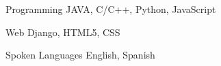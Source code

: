 \documentclass[12pt, a4paper]{awesome-cv}
\begin{document}
\begin{cventries}

\end{cventries}


\begin{cvskills}
  \cvskill
    {Programming} 
    {JAVA, C/C++, Python, JavaScript} 

  \cvskill
    {Web} 
    {Django, HTML5, CSS} 


  \cvskill
    {Spoken Languages} 
    {English, Spanish} 

\end{cvskills}




\end{document}
